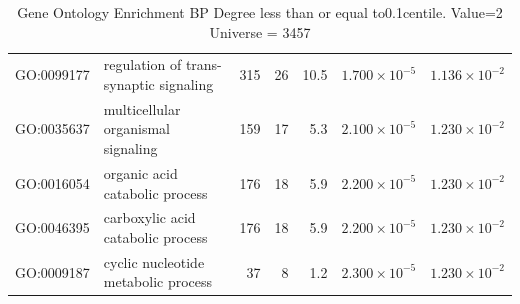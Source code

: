 \begin{table}[ht]
\begin{adjustbox}{max width=\textwidth}
\begin{tabular}{llrrrrr}
  GO:0099177 & regulation of trans-synaptic signaling & 315 & 26 & 10.5 & $1.700 \times 10^{-5}$ & $1.136 \times 10^{-2}$ \\ 
  GO:0035637 & multicellular organismal signaling & 159 & 17 & 5.3 & $2.100 \times 10^{-5}$ & $1.230 \times 10^{-2}$ \\ 
  GO:0016054 & organic acid catabolic process & 176 & 18 & 5.9 & $2.200 \times 10^{-5}$ & $1.230 \times 10^{-2}$ \\ 
  GO:0046395 & carboxylic acid catabolic process & 176 & 18 & 5.9 & $2.200 \times 10^{-5}$ & $1.230 \times 10^{-2}$ \\ 
  GO:0009187 & cyclic nucleotide metabolic process & 37 & 8 & 1.2 & $2.300 \times 10^{-5}$ & $1.230 \times 10^{-2}$ \\ 
   \hline
\end{tabular}
\end{adjustbox}
\caption{Gene Ontology Enrichment BP Degree  less than or equal to0.1centile.   Value=2 Universe = 3457} 
\label{tab:Gene Ontology Enrichment BP Degree  less than or equal to0.1centile.   Value=2 Universe = 3457}
\end{table}

